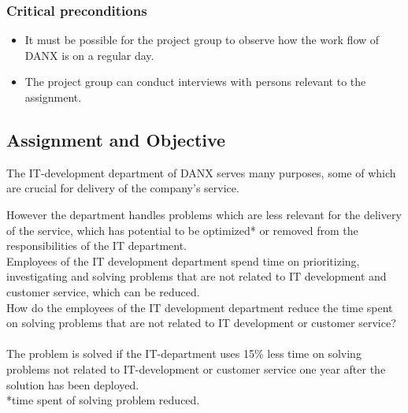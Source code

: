 \documentclass[pdftext, 12pt, a4paper]{report}
\begin{document}
\subsubsection*{Critical preconditions}
\begin{itemize}
	\item It must be possible for the project group to observe how the work flow of DANX is on a regular day.
	\item The project group can conduct interviews with persons relevant to the assignment.
	\end{itemize}
\newpage
\subsection*{Assignment and Objective}
The IT-development department of DANX serves many purposes, some of which are crucial for delivery of the company’s service.

However the department handles problems which are less relevant for the delivery of the service, which has potential to be optimized* or removed from the responsibilities of the IT department. \\

Employees of the IT development department spend time on prioritizing, investigating and solving problems that are not related to IT development and customer service, which can be reduced. \\

How do the employees of the IT development department reduce the time spent on solving problems that are not related to IT development or customer service?
\\ \\
The problem is solved if the IT-department uses 15\% less time on solving problems not related to IT-development or customer service one year after the solution has been deployed.
\\
\small{*time spent of solving problem reduced.}\\
\end{document}
